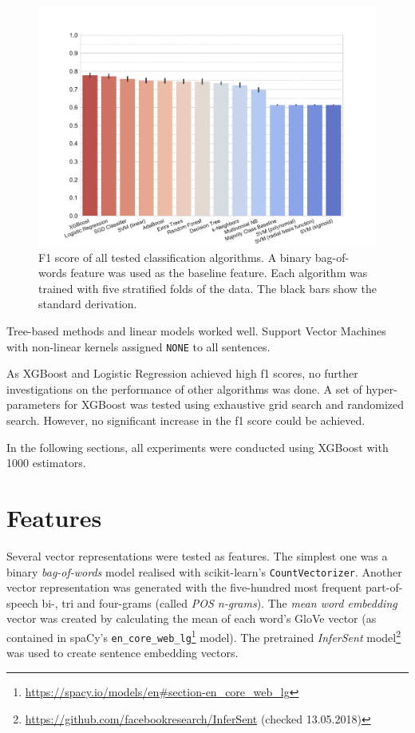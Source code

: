 \begin{figure}[tb]
\centering
\caption{F1 score of all tested classification algorithms. A binary bag-of-words feature was used as the baseline feature. Each algorithm was trained with five stratified folds of the data. The black bars show the standard derivation.}
\label{tbl:algo}
\includegraphics[width=1\linewidth]{images/classifier}
\end{figure}


Tree-based methods and linear models worked well. Support Vector Machines with non-linear kernels assigned \texttt{NONE} to all sentences.

As XGBoost and Logistic Regression achieved high f1 scores, no further investigations on the performance of other algorithms was done. A set of hyper-parameters for XGBoost was tested using exhaustive grid search and randomized search. However, no significant increase in the f1 score could be achieved.

In the following sections, all experiments were conducted using XGBoost with 1000 estimators.


\section{Features}
\label{sec:features}
Several vector representations were tested as features. The simplest one was a binary \emph{bag-of-words} model realised with scikit-learn's \texttt{CountVectorizer}. Another vector representation was generated with the five-hundred most frequent part-of-speech bi-, tri and four-grams (called \emph{POS n-grams}). The \emph{mean word embedding} vector was created by calculating the mean of each word's GloVe vector (as contained in spaCy's \texttt{en\_core\_web\_lg}\footnote{\url{https://spacy.io/models/en\#section-en\_core\_web\_lg}} model). The pretrained \emph{InferSent} model\footnote{\url{https://github.com/facebookresearch/InferSent} (checked 13.05.2018)} was used to create sentence embedding vectors.

